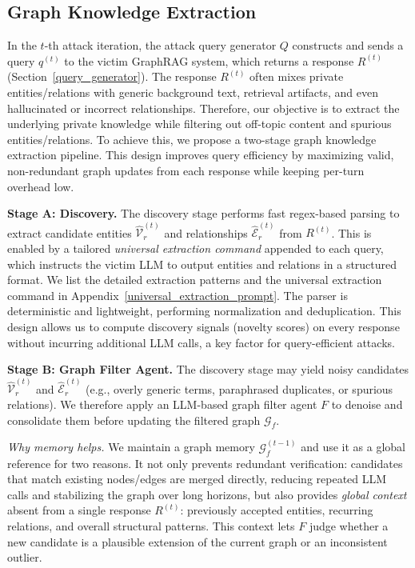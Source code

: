 \subsection{Graph Knowledge Extraction}
\label{sec:knowledge_extraction}
In the $t$-th attack iteration, the attack query generator $Q$ constructs and sends a query $q^{(t)}$ to the victim GraphRAG system, which returns a response $R^{(t)}$ (Section~\ref{query_generator}). 
The response $R^{(t)}$ often mixes private entities/relations with generic background text, retrieval artifacts, and even hallucinated or incorrect relationships. Therefore, our objective is to extract the underlying private knowledge while filtering out off-topic content and spurious entities/relations. To achieve this, we propose a two-stage graph knowledge extraction pipeline. This design improves query efficiency by maximizing valid, non-redundant graph updates from each response while keeping per-turn overhead low.


\noindent\textbf{Stage A: Discovery.}
The discovery stage performs fast regex-based parsing to extract candidate entities $\hat{\mathcal{V}}_r^{(t)}$ and relationships $\hat{\mathcal{E}}_r^{(t)}$ from $R^{(t)}$. This is enabled by a tailored \textit{universal extraction command} appended to each query, which instructs the victim LLM to output entities and relations in a structured format. 
We list the detailed extraction patterns and the universal extraction command in Appendix~\ref{universal_extraction_prompt}. 
The parser is deterministic and lightweight, performing normalization and deduplication. This design allows us to compute discovery signals (novelty scores) on every response without incurring additional LLM calls, a key factor for query-efficient attacks. 


\noindent\textbf{Stage B: Graph Filter Agent.}
The discovery stage may yield noisy candidates $\hat{\mathcal{V}}_r^{(t)}$ and $\hat{\mathcal{E}}_r^{(t)}$ (e.g., overly generic terms, paraphrased duplicates, or spurious relations). We therefore apply an LLM-based graph filter agent $F$ to denoise and consolidate them before updating the filtered graph $\mathcal{G}_f$. 

\emph{Why memory helps.}
We maintain a graph memory $\mathcal{G}_f^{(t-1)}$ and use it as a global reference for two reasons.
It not only prevents redundant verification: candidates that match existing nodes/edges are merged directly, reducing repeated LLM calls and stabilizing the graph over long horizons, but also provides \emph{global context} absent from a single response $R^{(t)}$: previously accepted entities, recurring relations, and overall structural patterns. This context lets $F$ judge whether a new candidate is a plausible extension of the current graph or an inconsistent outlier.

